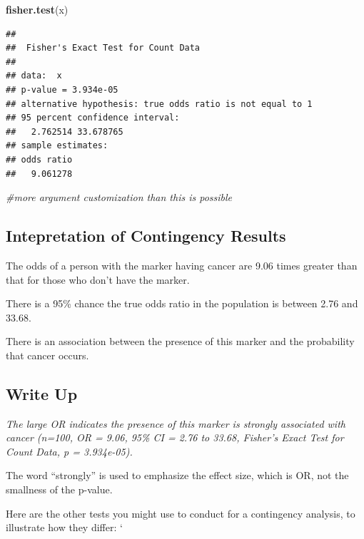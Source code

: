 \documentclass[]{book}
\newenvironment{Shaded}{\begin{snugshade}}{\end{snugshade}}
\newcommand{\CommentTok}[1]{\textcolor[rgb]{0.56,0.35,0.01}{\textit{#1}}}
\newcommand{\KeywordTok}[1]{\textcolor[rgb]{0.13,0.29,0.53}{\textbf{#1}}}
\newcommand{\NormalTok}[1]{#1}
\begin{document}
\begin{Shaded}
\begin{Highlighting}[]
\KeywordTok{fisher.test}\NormalTok{(x) }
\end{Highlighting}
\end{Shaded}

\begin{verbatim}
## 
##  Fisher's Exact Test for Count Data
## 
## data:  x
## p-value = 3.934e-05
## alternative hypothesis: true odds ratio is not equal to 1
## 95 percent confidence interval:
##   2.762514 33.678765
## sample estimates:
## odds ratio 
##   9.061278
\end{verbatim}

\begin{Shaded}
\begin{Highlighting}[]
\CommentTok{#more argument customization than this is possible }
\end{Highlighting}
\end{Shaded}

\hypertarget{intepretation-of-contingency-results}{%
\subsection{Intepretation of Contingency Results}\label{intepretation-of-contingency-results}}

The odds of a person with the marker having cancer are 9.06 times greater than that for those who don't have the marker.

There is a 95\% chance the true odds ratio in the population is between 2.76 and 33.68.

There is an association between the presence of this marker and the probability that cancer occurs.

\hypertarget{write-up-3}{%
\subsection{Write Up}\label{write-up-3}}

\emph{The large OR indicates the presence of this marker is strongly associated with cancer (n=100, OR = 9.06, 95\% CI = 2.76 to 33.68, Fisher's Exact Test for Count Data, p = 3.934e-05).}

The word ``strongly'' is used to emphasize the effect size, which is OR, not the smallness of the p-value.

Here are the other tests you might use to conduct for a contingency analysis, to illustrate how they differ: `
\end{document}
